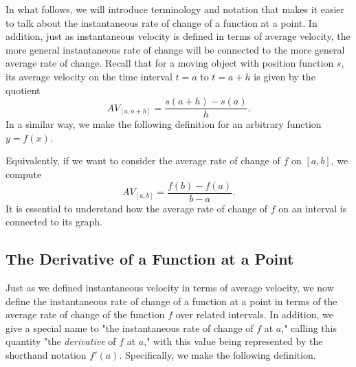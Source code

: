 In what follows, we will introduce terminology and notation that makes it easier to talk about the instantaneous rate of change of a function at a point.  In addition, just as instantaneous velocity is defined in terms of average velocity, the more general instantaneous rate of change will be connected to the more general average rate of change.  Recall that for a moving object with position function $s$, its average velocity on the time interval $t = a$ to $t = a+h$ is given by the quotient 
\[ AV_{[a,a+h]} = \frac{s(a+h)-s(a)}{h}. \]
In a similar way, we make the following definition for an arbitrary function $y = f(x).$


Equivalently, if we want to consider the average rate of change of $f$ on $[a,b]$, we compute 
\[ AV_{[a,b]} = \frac{f(b)-f(a)}{b-a}. \]
It is essential to understand how the average rate of change of $f$ on an interval is connected to its graph.



\subsection*{The Derivative of a Function at a Point}

Just as we defined instantaneous velocity in terms of average velocity, we now define the instantaneous rate of change of a function at a point in terms of the average rate of change of the function $f$ over related intervals.  In addition, we give a special name to "the instantaneous rate of change of $f$ at $a$," calling this quantity "the \emph{derivative} of $f$ at $a$," with this value being represented by the shorthand notation $f'(a)$.   Specifically, we make the following definition.


